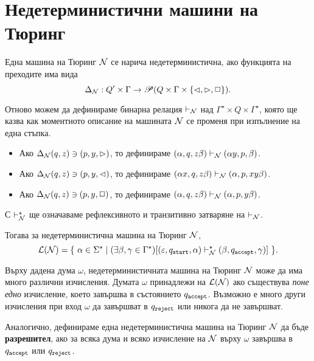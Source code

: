 \section{Недетерминистични машини на Тюринг}

Една машина на Тюринг $\mathcal{N}$ се нарича недетерминистична, ако функцията на преходите има вида
\[\Delta_{\mathcal{N}}: Q'\times \Gamma \to \mathscr{P}(Q \times \Gamma\times \{\lhd,\rhd,\Box\}). \]

Отново можем да дефинираме бинарна релация $\vdash_{\mathcal{N}}$ над $\Gamma^\star \times Q \times \Gamma^\star$,
която ще казва как моментното описание на машината $\mathcal{N}$ се променя при изпълнение на една стъпка.
\begin{itemize}
\item
  Ако $\Delta_{\mathcal{N}}(q,z) \ni (p,y,\rhd)$, то дефинираме $(\alpha, q, z\beta) \vdash_{\mathcal{N}} (\alpha y, p, \beta)$.
\item 
  Ако $\Delta_{\mathcal{N}}(q,z) \ni (p,y,\lhd)$, то дефинираме $(\alpha x, q, z\beta) \vdash_{\mathcal{N}} (\alpha , p, xy\beta)$.
\item 
  Ако $\Delta_{\mathcal{N}}(q,z) \ni (p,y,\Box)$, то дефинираме $(\alpha, q, z\beta) \vdash_{\mathcal{N}} (\alpha, p, y\beta)$.
\end{itemize}
С $\vdash^\star_{\mathcal{N}}$ ще означаваме рефлексивното и транзитивно затваряне на $\vdash_{\mathcal{N}}$.

Тогава за недетерминистична машина на Тюринг $\mathcal{N}$, 
\[\mathcal{L}(\mathcal{N}) = \{\ \alpha\in\Sigma^\star \mid (\exists \beta,\gamma \in \Gamma^\star)[(\varepsilon, q_{\texttt{start}}, \alpha) \vdash^\star_{\mathcal{N}} (\beta, q_{\texttt{accept}}, \gamma) ]\ \}.\]

\begin{remark}
  Върху дадена дума $\omega$, недетерминистичната машина на Тюринг $\mathcal{N}$ може да има много различни изчисления.
  Думата $\omega$ принадлежи на $\mathcal{L}(\mathcal{N})$ ако съществува {\em поне едно} изчисление, което завършва в състоянието $q_{\texttt{accept}}$.
  Възможно е много други изчисления при вход $\omega$ да завършват в $q_{\texttt{reject}}$ или никога да не завършват.
\end{remark}

Аналогично, дефинираме една недетерминистична машина на Тюринг $\mathcal{N}$ да бъде {\bf разрешител}, ако за всяка дума и 
всяко изчисление на $\mathcal{N}$ върху $\omega$ завършва в $q_{\texttt{accept}}$ или $q_{\texttt{reject}}$.


